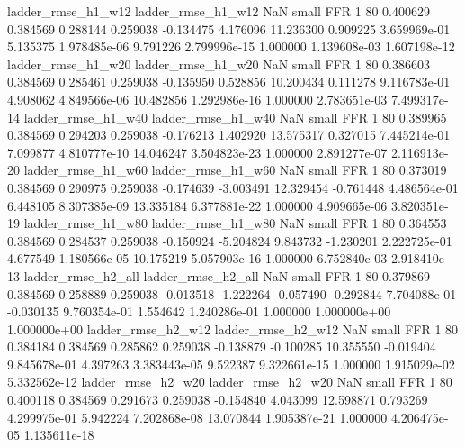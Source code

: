       ladder_rmse_h1_w12       ladder_rmse_h1_w12                   NaN      small      FFR                 1 80 0.400629       0.384569 0.288144       0.259038   -0.134475      4.176096     11.236300     0.909225   3.659969e-01  5.135375 1.978485e-06     9.791226   2.799996e-15            1.000000    1.139608e-03        1.607198e-12
      ladder_rmse_h1_w20       ladder_rmse_h1_w20                   NaN      small      FFR                 1 80 0.386603       0.384569 0.285461       0.259038   -0.135950      0.528856     10.200434     0.111278   9.116783e-01  4.908062 4.849566e-06    10.482856   1.292986e-16            1.000000    2.783651e-03        7.499317e-14
      ladder_rmse_h1_w40       ladder_rmse_h1_w40                   NaN      small      FFR                 1 80 0.389965       0.384569 0.294203       0.259038   -0.176213      1.402920     13.575317     0.327015   7.445214e-01  7.099877 4.810777e-10    14.046247   3.504823e-23            1.000000    2.891277e-07        2.116913e-20
      ladder_rmse_h1_w60       ladder_rmse_h1_w60                   NaN      small      FFR                 1 80 0.373019       0.384569 0.290975       0.259038   -0.174639     -3.003491     12.329454    -0.761448   4.486564e-01  6.448105 8.307385e-09    13.335184   6.377881e-22            1.000000    4.909665e-06        3.820351e-19
      ladder_rmse_h1_w80       ladder_rmse_h1_w80                   NaN      small      FFR                 1 80 0.364553       0.384569 0.284537       0.259038   -0.150924     -5.204824      9.843732    -1.230201   2.222725e-01  4.677549 1.180566e-05    10.175219   5.057903e-16            1.000000    6.752840e-03        2.918410e-13
      ladder_rmse_h2_all       ladder_rmse_h2_all                   NaN      small      FFR                 1 80 0.379869       0.384569 0.258889       0.259038   -0.013518     -1.222264     -0.057490    -0.292844   7.704088e-01 -0.030135 9.760354e-01     1.554642   1.240286e-01            1.000000    1.000000e+00        1.000000e+00
      ladder_rmse_h2_w12       ladder_rmse_h2_w12                   NaN      small      FFR                 1 80 0.384184       0.384569 0.285862       0.259038   -0.138879     -0.100285     10.355550    -0.019404   9.845678e-01  4.397263 3.383443e-05     9.522387   9.322661e-15            1.000000    1.915029e-02        5.332562e-12
      ladder_rmse_h2_w20       ladder_rmse_h2_w20                   NaN      small      FFR                 1 80 0.400118       0.384569 0.291673       0.259038   -0.154840      4.043099     12.598871     0.793269   4.299975e-01  5.942224 7.202868e-08    13.070844   1.905387e-21            1.000000    4.206475e-05        1.135611e-18
